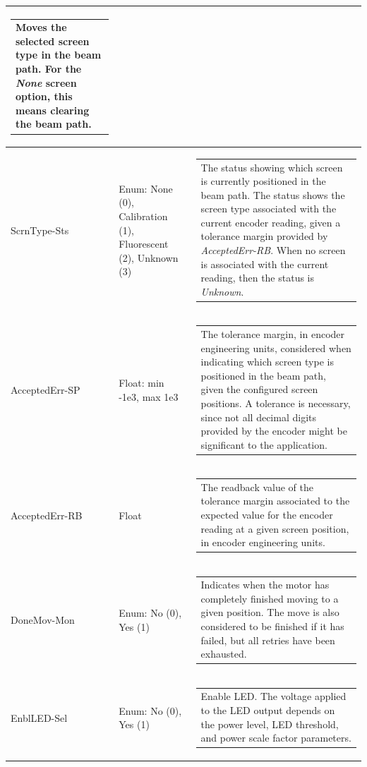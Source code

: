 \documentclass[openany]{article}
\begin{document}
\begin{longtable}{| m{4.5cm} m{2.5cm}  m{7.0cm} |}
\begin{tabular}{@{}m{6cm}@{}}
                Moves the selected screen type in the beam path. For the \emph{None} screen option, this means clearing the beam path.
            \end{tabular} \hypertarget{}{}\\ \hline
        ScrnType-Sts & Enum: None (0), Calibration (1), Fluorescent (2), Unknown (3) & \begin{tabular}{@{}m{6cm}@{}}
                The status showing which screen is currently positioned in the beam path. The status shows the screen type associated with the current encoder reading, given a tolerance margin provided by \emph{AcceptedErr-RB}. When no screen is associated with the current reading, then the status is \emph{Unknown}.
            \end{tabular} \hypertarget{pv:accepted-err}{}\\ \hline
        AcceptedErr-SP & Float: min -1e3, max 1e3 & \begin{tabular}{@{}m{6cm}@{}}
                The tolerance margin, in encoder engineering units, considered when indicating which screen type is positioned in the beam path, given the configured screen positions. A tolerance is necessary, since not all decimal digits provided by the encoder might be significant to the application. 
            \end{tabular} \hypertarget{}{}\\ \hline
        AcceptedErr-RB & Float & \begin{tabular}{@{}m{6cm}@{}}
                The readback value of the tolerance margin associated to the expected value for the encoder reading at a given screen position, in encoder engineering units.
            \end{tabular} \hypertarget{pv:done-mov-mon}{}\\ \hline
        DoneMov-Mon & Enum: No (0), Yes (1) & \begin{tabular}{@{}m{6cm}@{}}
                Indicates when the motor has completely finished moving to a given position. The move is also considered to be finished if it has failed, but all retries have been exhausted.
            \end{tabular} \hypertarget{pv:enbl-led}{}\\ \hline
        EnblLED-Sel & Enum: No (0), Yes (1) & \begin{tabular}{@{}m{6cm}@{}}
                Enable LED. The voltage applied to the LED output depends on the power level, LED threshold, and power scale factor parameters.

\end{tabular}
\end{longtable}
\end{document}
